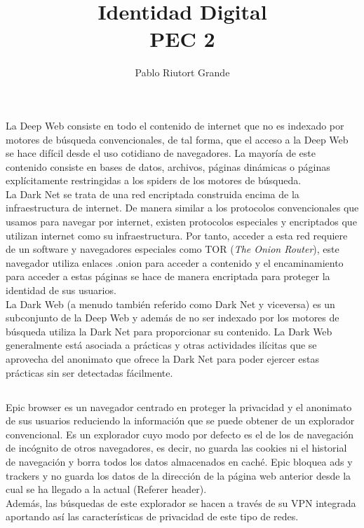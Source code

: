 \documentclass[10pt,a4paper]{article}
\author{Pablo Riutort Grande}
\title{Identidad Digital\\ \vspace{1cm}\textbf{PEC 2}}
\begin{document}
\maketitle
\pagebreak
\section{}
\subsection{}
La Deep Web consiste en todo el contenido de internet que no es indexado por motores de búsqueda convencionales, de tal forma, que el acceso a la Deep Web se hace difícil desde el uso cotidiano de navegadores. La mayoría de este contenido consiste en bases de datos, archivos, páginas dinámicas o páginas explícitamente restringidas a los spiders de los motores de búsqueda.\\

La Dark Net se trata de una red encriptada construida encima de la infraestructura de internet. De manera similar a los protocolos convencionales que usamos para navegar por internet, existen protocolos especiales y encriptados que utilizan internet como su infraestructura. Por tanto, acceder a esta red requiere de un software y navegadores especiales como TOR (\textit{The Onion Router}), este navegador utiliza enlaces .onion para acceder a contenido y el encaminamiento para acceder a estas páginas se hace de manera encriptada para proteger la identidad de sus usuarios.\\

La Dark Web (a menudo también referido como Dark Net y viceversa) es un subconjunto de la Deep Web y además de no ser indexado por los motores de búsqueda utiliza la Dark Net para proporcionar su contenido. La Dark Web generalmente está asociada a prácticas y otras actividades ilícitas que se aprovecha del anonimato que ofrece la Dark Net para poder ejercer estas prácticas sin ser detectadas fácilmente.
\subsection{}
Epic browser es un navegador centrado en proteger la privacidad y el anonimato de sus usuarios reduciendo la información que se puede obtener de un explorador convencional. Es un explorador cuyo modo por defecto es el de los de navegación de incógnito de otros navegadores, es decir, no guarda las cookies ni el historial de navegación y borra todos los datos almacenados en caché. Epic bloquea ads y trackers y no guarda los datos de la dirección de la página web anterior desde la cual se ha llegado a la actual (Referer header).\\
Además, las búsquedas de este explorador se hacen a través de su VPN integrada aportando así las características de privacidad de este tipo de redes.
\end{document}
